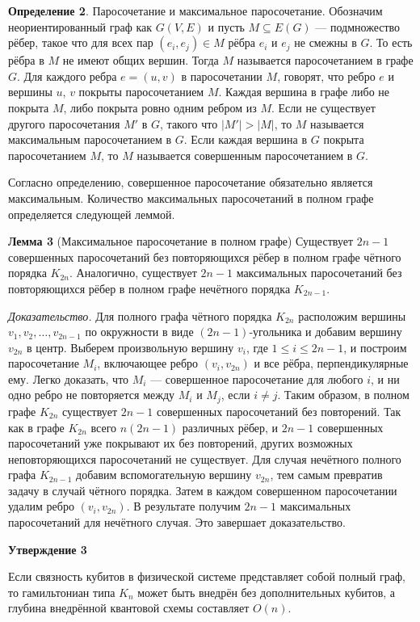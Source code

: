 \textbf{Определение 2}. Паросочетание и максимальное паросочетание. Обозначим
неориентированный граф как $G(V, E)$ и пусть $M \subseteq E(G)$ — подмножество
рёбер, такое что для всех пар $(e_i, e_j) \in M$ рёбра $e_i$ и $e_j$ не смежны
в $G$. То есть рёбра в $M$ не имеют общих вершин. Тогда $M$ называется
паросочетанием в графе $G$. Для каждого ребра $e = (u, v)$ в паросочетании $M$,
говорят, что ребро $e$ и вершины $u$, $v$ покрыты паросочетанием $M$. Каждая
вершина в графе либо не покрыта $M$, либо покрыта ровно одним ребром из $M$.
Если не существует другого паросочетания $M'$ в $G$, такого что $|M'| > |M|$,
то $M$ называется максимальным паросочетанием в $G$. Если каждая вершина в $G$
покрыта паросочетанием $M$, то $M$ называется совершенным паросочетанием в $G$.

Согласно определению, совершенное паросочетание обязательно является
максимальным. Количество максимальных паросочетаний в полном графе определяется
следующей леммой.

\textbf{Лемма 3} (Максимальное паросочетание в полном графе) Существует $2n -
1$ совершенных паросочетаний без повторяющихся рёбер в полном графе чётного
порядка $K_{2n}$. Аналогично, существует $2n - 1$ максимальных паросочетаний
без повторяющихся рёбер в полном графе нечётного порядка $K_{2n - 1}$.

\textit{Доказательство.} Для полного графа чётного порядка $K_{2n}$ расположим
вершины $v_1, v_2, \dots, v_{2n-1}$ по окружности в виде $(2n - 1)$‑угольника и
добавим вершину $v_{2n}$ в центр. Выберем произвольную вершину $v_i$, где $1
\leq i \leq 2n - 1$, и построим паросочетание $M_i$, включающее ребро $(v_i,
v_{2n})$ и все рёбра, перпендикулярные ему. Легко доказать, что $M_i$ —
совершенное паросочетание для любого $i$, и ни одно ребро не повторяется между
$M_i$ и $M_j$, если $i \ne j$. Таким образом, в полном графе $K_{2n}$
существует $2n - 1$ совершенных паросочетаний без повторений. Так как в графе
$K_{2n}$ всего $n(2n - 1)$ различных рёбер, и $2n - 1$ совершенных
паросочетаний уже покрывают их без повторений, других возможных неповторяющихся
паросочетаний не существует. Для случая нечётного полного графа $K_{2n - 1}$
добавим вспомогательную вершину $v_{2n}$, тем самым превратив задачу в случай
чётного порядка. Затем в каждом совершенном паросочетании удалим ребро $(v_i,
v_{2n})$. В результате получим $2n - 1$ максимальных паросочетаний для
нечётного случая. Это завершает доказательство.

\textbf{Утверждение 3}

Если связность кубитов в физической системе представляет собой полный граф, то
гамильтониан типа $K_n$ может быть внедрён без дополнительных кубитов, а
глубина внедрённой квантовой схемы составляет $O(n)$.

